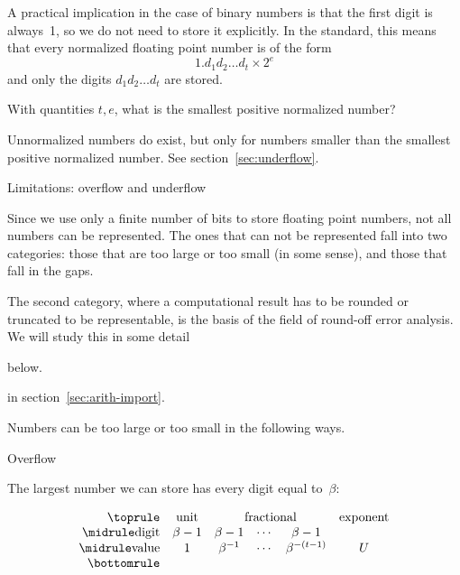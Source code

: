 A practical implication in the case of binary numbers is that the
first digit is always~1, so we do not need to store it explicitly.
In the  standard,
this means that every normalized floating point number
is of the form
\begin{equation}
  1.d_1d_2\ldots d_t\times 2^e
\end{equation}
and only the digits $d_1d_2\ldots d_t$ are stored.

\begin{exercise}
  With quantities $t,e$, what is the smallest positive normalized number?
\end{exercise}

Unnormalized numbers do exist, but only for numbers smaller
than the smallest positive normalized number.
See section~\ref{sec:underflow}.


 {Limitations: overflow and underflow}
\label{sec:exceptions}

Since we use only a finite number of bits to store floating point
numbers, not all numbers can be represented. The ones that can not be
represented fall into two categories: those that are too large or too
small (in some sense), and those that fall in the gaps.

The second category, where a computational result has to be rounded or
truncated to be representable, is the basis of the field of round-off
error analysis.
We will study this in some detail
\begin{nopackt}
below.
\end{nopackt}
\begin{packt}
in section~\ref{sec:arith-import}.  
\end{packt}

Numbers can be
too large or too small in the following ways.

 {Overflow}

The largest number we can store has every digit equal to~$\beta$:

\begin{equation}
\begin{array}{rccccc}
  \toprule
  &\textrm{unit}&\multicolumn{3}{c}{\textrm{fractional}}&\textrm{exponent}\\
  \midrule
  \textrm{digit}&\beta-1&\beta-1&\cdots&\beta-1&\\
  \midrule
  \textrm{value}&1&\beta^{-1}&\cdots&\beta^{-(t-1)}&U \\
  \bottomrule
\end{array}
\end{equation}

